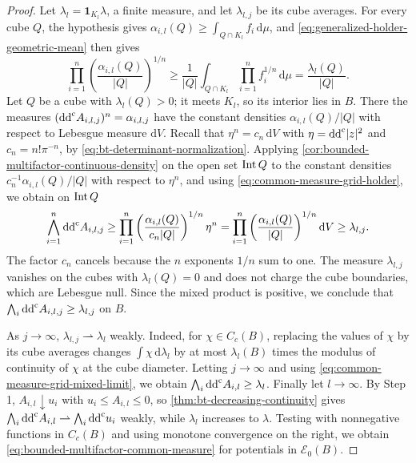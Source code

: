 \begin{proof}
Let $\lambda_l=\mathbf1_{K_l}\lambda$, a finite measure, and let $\lambda_{l,j}$ be its cube averages. For every cube $Q$, the hypothesis gives $\alpha_{i,l}(Q)\geq\int_{Q\cap K_l}f_i\,\mathrm d\mu$, and \eqref{eq:generalized-holder-geometric-mean} then gives
\begin{equation}\label{eq:common-measure-grid-holder}
 \prod_{i=1}^n\left(\frac{\alpha_{i,l}(Q)}{|Q|}\right)^{1/n}
 \geq\frac1{|Q|}\int_{Q\cap K_l}\prod_{i=1}^nf_i^{1/n}\,\mathrm d\mu
 =\frac{\lambda_l(Q)}{|Q|}.
\end{equation}
Let $Q$ be a cube with $\lambda_l(Q)>0$; it meets $K_l$, so its interior lies in $B$. There the measures $(\mathrm{dd}^{\mathrm{c}} A_{i,l,j})^n=\alpha_{i,l,j}$ have the constant densities $\alpha_{i,l}(Q)/|Q|$ with respect to Lebesgue measure $\mathrm dV$. Recall that $\eta^n=c_n\,\mathrm dV$ with $\eta=\mathrm{dd}^{\mathrm{c}}|z|^2$ and $c_n=n!\pi^{-n}$, by \eqref{eq:bt-determinant-normalization}. Applying \cref{cor:bounded-multifactor-continuous-density} on the open set $\operatorname{Int} Q$ to the constant densities $c_n^{-1}\alpha_{i,l}(Q)/|Q|$ with respect to $\eta^n$, and using \eqref{eq:common-measure-grid-holder}, we obtain on $\operatorname{Int} Q$
\[
 \bigwedge_{i=1}^n\mathrm{dd}^{\mathrm{c}} A_{i,l,j}
 \geq\prod_{i=1}^n\left(\frac{\alpha_{i,l}(Q)}{c_n|Q|}\right)^{1/n}\eta^n
 =\prod_{i=1}^n\left(\frac{\alpha_{i,l}(Q)}{|Q|}\right)^{1/n}\mathrm dV
 \geq\lambda_{l,j}.
\]
The factor $c_n$ cancels because the $n$ exponents $1/n$ sum to one. The measure $\lambda_{l,j}$ vanishes on the cubes with $\lambda_l(Q)=0$ and does not charge the cube boundaries, which are Lebesgue null. Since the mixed product is positive, we conclude that $\bigwedge_i\mathrm{dd}^{\mathrm{c}} A_{i,l,j}\geq\lambda_{l,j}$ on $B$.

As $j\to\infty$, $\lambda_{l,j}\rightharpoonup\lambda_l$ weakly. Indeed, for $\chi\in C_c(B)$, replacing the values of $\chi$ by its cube averages changes $\int\chi\,\mathrm d\lambda_l$ by at most $\lambda_l(B)$ times the modulus of continuity of $\chi$ at the cube diameter. Letting $j\to\infty$ and using \eqref{eq:common-measure-grid-mixed-limit}, we obtain $\bigwedge_i\mathrm{dd}^{\mathrm{c}} A_{i,l}\geq\lambda_l$. Finally let $l\to\infty$. By Step 1, $A_{i,l}\downarrow u_i$ with $u_i\leq A_{i,l}\leq0$, so \cref{thm:bt-decreasing-continuity} gives $\bigwedge_i\mathrm{dd}^{\mathrm{c}} A_{i,l}\rightharpoonup\bigwedge_i\mathrm{dd}^{\mathrm{c}} u_i$ weakly, while $\lambda_l$ increases to $\lambda$. Testing with nonnegative functions in $C_c(B)$ and using monotone convergence on the right, we obtain \eqref{eq:bounded-multifactor-common-measure} for potentials in $\mathcal E_0(B)$.


\end{proof}

